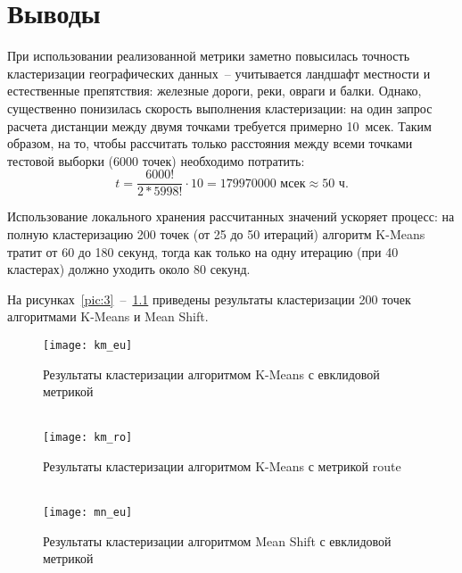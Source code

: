 \newpage

\chapter{Выводы}
При использовании реализованной метрики заметно повысилась точность кластеризации географических
данных~-- учитывается ландшафт местности и естественные препятствия: железные дороги, реки,
овраги и балки. Однако, существенно понизилась скорость выполнения кластеризации:
на один запрос расчета дистанции между двумя точками требуется примерно 10~мсек.
Таким образом, на то, чтобы рассчитать только расстояния между всеми точками тестовой выборки
(6000 точек) необходимо потратить:
\[
    t = \frac{6000!}{2 * 5998!} \cdot 10 = 179970000\textrm{ мсек} \approx 50\textrm{ ч}.
\]

Использование локального хранения рассчитанных значений ускоряет процесс: на полную кластеризацию
200 точек (от 25 до 50 итераций) алгоритм K-Means тратит от 60 до 180 секунд, тогда как только на
одну итерацию (при 40 кластерах) должно уходить около 80 секунд.

На рисунках~\ref{pic:3}~--~\ref{pic:5} приведены результаты кластеризации 200 точек алгоритмами
K-Means и Mean Shift.

\begin{figure}[hp!]
    \center
    \vspace{-1cm}
    \texttt{[image: km\_eu]}\\
    \parbox{.8\textwidth}{\centering
        \caption{Результаты кластеризации алгоритмом K-Means с евклидовой
            метрикой} \label{pic:3}}\\
    \texttt{[image: km\_ro]}\\
    \parbox{.8\textwidth}{\centering
        \caption{Результаты кластеризации алгоритмом K-Means с метрикой route} \label{pic:4}}\\
    \texttt{[image: mn\_eu]}\\
    \parbox{.8\textwidth}{\centering
        \caption{Результаты кластеризации алгоритмом Mean Shift с евклидовой
            метрикой} \label{pic:5}}
\end{figure}

\newpage

